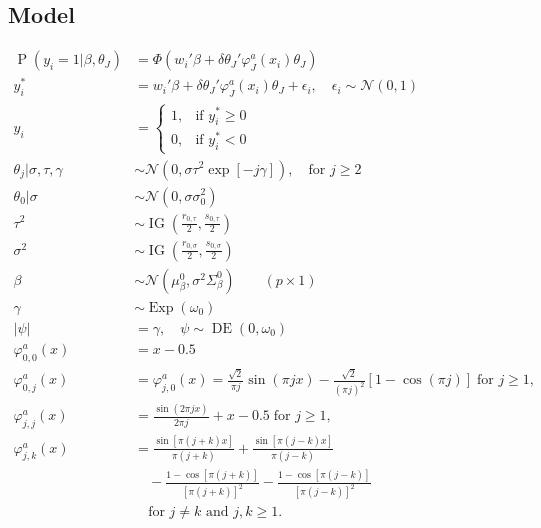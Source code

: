 \documentclass[11pt]{article}
\newcommand{\opn}{\operatorname}
\begin{document}
\subsection{Model}
  \begin{align*}
    \opn{P}\left(y_{i}=1|\beta, \theta_{J}\right) &= \Phi\left(w_{i}'\beta + \delta\theta_{J}'\varphi_{J}^{a}\left(x_{i}\right)\theta_{J}\right)\\
    y_{i}^{*} &= w_{i}'\beta + \delta \theta_{J}'\varphi_{J}^{a}\left(x_{i}\right)\theta_{J} + \epsilon_{i}, \quad \epsilon_{i} \sim \mathcal{N}\left(0,1\right)\\
    y_{i} &= \begin{cases}1, & \text{if $y_{i}^{*} \geq 0$}\\ 0, & \text{if $y_{i}^{*} < 0$} \end{cases}\\
    \theta_{j}|\sigma, \tau, \gamma &\sim \mathcal{N}\left(0, \sigma\tau^{2}\exp\left[-j\gamma\right]\right), \quad \text{for $j\geq 2$}\\
    \theta_{0}|\sigma &\sim \mathcal{N}\left(0, \sigma\sigma_{0}^{2}\right)\\
    \tau^{2} &\sim \opn{IG}\left(\frac{r_{0,\tau}}{2}, \frac{s_{0,\tau}}{2}\right)\\
    \sigma^{2} &\sim \opn{IG}\left(\frac{r_{0,\sigma}}{2}, \frac{s_{0,\sigma}}{2}\right)\\
    \beta &\sim \mathcal{N}\left(\mu_{\beta}^{0}, \sigma^{2}\Sigma_{\beta}^{0}\right)\qquad \left(p\times 1\right)\\
    \gamma &\sim \opn{Exp}\left(\omega_{0}\right)\\
    \left|\psi\right| &= \gamma, \quad \psi \sim \opn{DE}\left(0,\omega_{0}\right)\\
    \varphi_{0,0}^{a}\left(x\right) &= x-0.5\\
    \varphi_{0,j}^{a}\left(x\right) &= \varphi_{j,0}^{a}\left(x\right)=\frac{\sqrt{2}}{\pi j}\sin\left(\pi jx\right) - \frac{\sqrt{2}}{\left(\pi j\right)^{2}}\left[1-\cos\left(\pi j\right)\right] \; \text{for } j \geq 1,\\
    \varphi_{j,j}^{a}\left(x\right) &= \frac{\sin\left(2\pi jx\right)}{2\pi j} + x - 0.5 \; \text{for } j \geq 1,\\
    \varphi_{j,k}^{a}\left(x\right) &= \frac{\sin\left[\pi\left(j + k\right)x\right]}{\pi\left(j+k\right)} + \frac{\sin\left[\pi\left(j-k\right)x\right]}{\pi\left(j-k\right)}\\
    &\quad -\frac{1-\cos\left[\pi\left(j+k\right)\right]}{\left[\pi\left(j+k\right)\right]^{2}} -\frac{1-\cos\left[\pi\left(j-k\right)\right]}{\left[\pi\left(j-k\right)\right]^{2}}\\
    &\quad \text{for $j\neq k$ and $j, k \geq 1$}.
  \end{align*}
\end{document}
